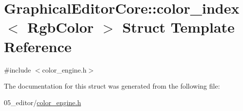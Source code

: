 \hypertarget{structGraphicalEditorCore_1_1color__index}{}\section{Graphical\+Editor\+Core\+:\+:color\+\_\+index$<$ Rgb\+Color $>$ Struct Template Reference}
\label{structGraphicalEditorCore_1_1color__index}


{\ttfamily \#include $<$color\+\_\+engine.\+h$>$}



The documentation for this struct was generated from the following file\+:\begin{DoxyCompactItemize}
\item 
05\+\_\+editor/\hyperlink{color__engine_8h}{color\+\_\+engine.\+h}\end{DoxyCompactItemize}
